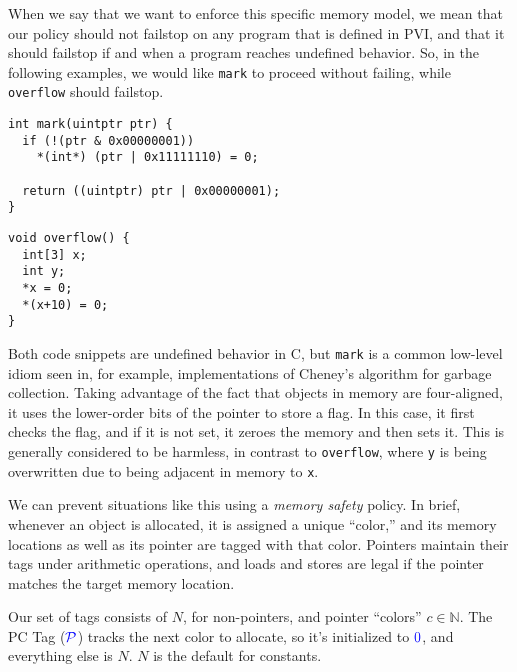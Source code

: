 \documentclass{llncs}
\begin{document}
When we say that we want to enforce this specific memory model, we mean that our policy should
not failstop on any program that is defined in PVI, and that it should failstop if and when a program
reaches undefined behavior. So, in the following examples, we would like {\tt mark} to proceed without
failing, while {\tt overflow} should failstop.

\begin{minipage}{0.7\textwidth}
\begin{verbatim}
int mark(uintptr ptr) {
  if (!(ptr & 0x00000001))
    *(int*) (ptr | 0x11111110) = 0;

  return ((uintptr) ptr | 0x00000001);
}
\end{verbatim}
\end{minipage}
\begin{minipage}{0.29\textwidth}
\begin{verbatim}
void overflow() {
  int[3] x;
  int y;
  *x = 0;
  *(x+10) = 0;
}
\end{verbatim}
\end{minipage}

Both code snippets are undefined behavior in C, but {\tt mark} is a common low-level
idiom seen in, for example, implementations of Cheney's algorithm for garbage collection.
Taking advantage of the fact that objects in memory are four-aligned, it
uses the lower-order bits of the pointer to store a flag. In this case, it first checks
the flag, and if it is not set, it zeroes the memory and then sets it. This is generally
considered to be harmless, in contrast to {\tt overflow}, where {\tt y} is being overwritten
due to being adjacent in memory to {\tt x}.

We can prevent situations like this using a {\em memory safety} policy. In brief, whenever
an object is allocated, it is assigned a unique ``color,'' and its memory locations as well
as its pointer are tagged with that color. Pointers maintain their tags under arithmetic
operations, and loads and stores are legal if the pointer matches the target memory location.

Our set of tags consists of
\(N\), for non-pointers, and pointer ``colors'' \(c \in \mathbb{N}\). The PC Tag
(\(\mathcal{\color{blue} P}\)) tracks the next color to allocate, so it's initialized to \({\color{blue} 0}\), and everything else is \(N\).
\(N\) is the default for constants.


\end{document}
